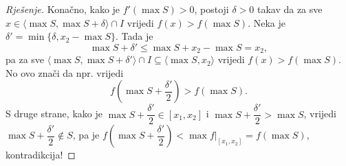 \begin{proof}[Rješenje]
Konačno, kako je $f'(\max{S})>0$, postoji $\delta>0$ takav da za sve $x\in \langle \max{S}, \max{S}+\delta\rangle\cap I$ vrijedi $f(x)>f(\max{S})$. Neka je $\delta'=\min\{\delta, x_2-\max{S}\}$. Tada je 
$$\max{S}+\delta'\leq \max{S}+x_2-\max{S}=x_2,$$
pa za sve $\langle \max{S}, \max{S}+\delta'\rangle\cap I\subseteq \langle \max{S}, x_2\rangle$ vrijedi $f(x)>f(\max{S})$. No ovo znači da npr. vrijedi $$f\left(\max{S}+\dfrac{\delta'}{2}\right)>f(\max{S}).$$ S druge strane, kako je $\max{S}+\dfrac{\delta'}{2}\in [x_1, x_2]$ i $\max{S}+\dfrac{\delta'}{2}>\max{S}$, vrijedi $\max{S}+\dfrac{\delta'}{2}\notin S$,
pa je $f\left(\max{S}+\dfrac{\delta'}{2}\right)<\max{f|_{[x_1, x_2]}}=f(\max{S})$, kontradikcija!
\end{proof}